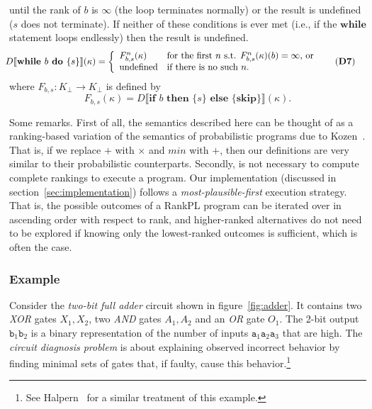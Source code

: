 \documentclass{llncs}
\newcommand{\dn}[1]{D\llbracket #1 \rrbracket}
\begin{document}
		until the rank of $b$ is $\infty$ (the loop terminates normally) or the result is undefined ($s$ does not terminate).
	If neither of these conditions is ever met (i.e., if the $\textbf{while}$ statement loops endlessly) then the result is undefined.
\begin{align}
\hspace{-5pt}\dn{\textbf{while }b\textbf{ do }\{ s \}}(\kappa) &=
		\left\{
			\begin{array}{ll}
				F_{b,s}^{n}(\kappa)		& \mbox{for the first }n\mbox{ s.t. }F_{b,s}^{n}(\kappa)(b) = \infty \mbox{, or }\\
				\mbox{undefined}		& \mbox{if there is no such }n.
			\end{array}\hspace{-5pt}\tag{\textbf{D7}}
		\right.
\end{align}
where $F_{b,s}: K_{\bot} \rightarrow K_{\bot}$ is defined by 
\begin{equation*}
F_{b,s}(\kappa) = \dn{\textbf{if }b\textbf{ then }\{ s \}\textbf{ else } \{ \textbf{skip} \}}(\kappa).
\end{equation*}

Some remarks.
First of all, the semantics described here can be thought of as a ranking-based variation of the 
	semantics of probabilistic programs due to Kozen~\cite{DBLP:journals/jcss/Kozen81}.
That is, if we replace $+$ with $\times$ and $min$ with $+$, then our definitions are very similar to their probabilistic counterparts.
Secondly, is not necessary to compute complete rankings to execute a program.
Our implementation (discussed in section~\ref{sec:implementation}) follows a \emph{most-plausible-first} execution strategy.
That is, the possible outcomes of a RankPL program can be iterated over in ascending order with respect to rank,
	and higher-ranked alternatives do not need to be explored if knowing only the lowest-ranked outcomes is sufficient, 
	which is often the case.

\subsubsection{Example}

Consider the \emph{two-bit full adder} circuit shown in figure~\ref{fig:adder}.
It contains two \emph{XOR} gates $X_1, X_2$, two \emph{AND} gates $A_1, A_2$ and an \emph{OR} gate $O_1$.
The 2-bit output $\texttt{b}_1\texttt{b}_2$ is a binary representation of the number of inputs $\texttt{a}_1\texttt{a}_2\texttt{a}_3$ that are high.
The \emph{circuit diagnosis problem} is about explaining observed incorrect behavior by finding minimal sets of gates that, if faulty, cause this behavior.\footnote{See Halpern~\cite[Chapter~9]{DBLP:books/daglib/0014219} for a similar treatment of this example.}
\end{document}
